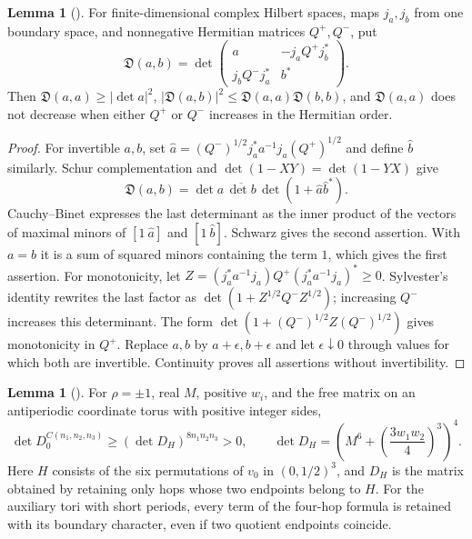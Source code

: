 \documentclass[11pt,letterpaper,reqno]{amsart}
\theoremstyle{definition}
\newtheorem{qcmlemma}[qcmproposition]{Lemma}
\newenvironment{lemma}[1][]{\pushQED{\qed}\renewcommand{\qedsymbol}{$\blacksquare$}\begin{qcmlemma}[#1]}{\popQED\end{qcmlemma}}
\begin{document}
\begin{lemma}\label{qcm:lattice-reflection-determinants}
For finite-dimensional complex Hilbert spaces, maps $j_a,j_b$ from
one boundary space, and nonnegative Hermitian matrices $Q^+,Q^-$,
put
\[
 \mathfrak D(a,b)=\det\begin{pmatrix}
  a&-j_aQ^+j_b^*\\ j_bQ^-j_a^*&b^*
 \end{pmatrix}.
\]
Then $\mathfrak D(a,a)\ge|\det a|^2$,
$|\mathfrak D(a,b)|^2\le\mathfrak D(a,a)\mathfrak D(b,b)$, and
$\mathfrak D(a,a)$ does not decrease when either $Q^+$ or $Q^-$
increases in the Hermitian order.
\end{lemma}

\begin{proof}
For invertible $a,b$, set
$\widehat a=(Q^-)^{1/2}j_a^*a^{-1}j_a(Q^+)^{1/2}$ and define
$\widehat b$ similarly. Schur complementation and
$\det(1-XY)=\det(1-YX)$ give
\[
 \mathfrak D(a,b)=\det a\,\overline{\det b}\,
                         \det(1+\widehat a\widehat b^*).
\]
Cauchy--Binet expresses the last determinant as the inner product of
the vectors of maximal minors of $[1\ \widehat a]$ and
$[1\ \widehat b]$. Schwarz gives the second assertion. With $a=b$
it is a sum of squared minors containing the term $1$, which gives
the first assertion. For monotonicity, let
$Z=(j_a^*a^{-1}j_a)Q^+(j_a^*a^{-1}j_a)^*\ge0$. Sylvester's identity
rewrites the last factor as $\det(1+Z^{1/2}Q^-Z^{1/2})$;
increasing $Q^-$ increases this determinant. The form
$\det(1+(Q^-)^{1/2}Z(Q^-)^{1/2})$ gives monotonicity in $Q^+$.
Replace $a,b$ by $a+\epsilon,b+\epsilon$ and let
$\epsilon\downarrow0$ through values for which both are invertible.
Continuity proves all assertions without invertibility.
\end{proof}

\begin{lemma}\label{qcm:lattice-free-endpoints}
For $\rho=\pm1$, real $M$, positive $w_i$, and the free matrix on
an antiperiodic coordinate torus with positive integer sides,
\[
 \det D_0^{C(n_1,n_2,n_3)}
 \ge (\det D_H)^{8n_1n_2n_3}>0,
 \qquad
 \det D_H=\left(M^6+\left(\frac{3w_1w_2}{4}\right)^3\right)^4.
\]
Here $H$ consists of the six permutations of $v_0$ in
$(0,1/2)^3$, and $D_H$ is the matrix obtained by retaining only
hops whose two endpoints belong to $H$. For the auxiliary tori with
short periods, every term of the four-hop formula is retained with
its boundary character, even if two quotient endpoints coincide.
\end{lemma}
\end{document}
